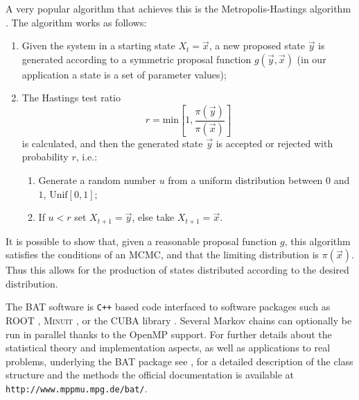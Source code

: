 A very popular algorithm that achieves this is the Metropolis-Hastings algorithm \cite{Metropolis,Hastings}. The algorithm works as follows:
\begin{enumerate}
	\item Given the system in a starting state $X_t=\vec{x}$, a new proposed state $\vec{y}$ is generated according to a symmetric proposal function $g(\vec{y},\vec{x})$ (in our application a state is a set of parameter values);
	\item The Hastings test ratio
		\[r=\text{min}\left[1,\frac{\pi(\vec{y})}{\pi(\vec{x})}\right]\]
		is calculated, and then the generated state $\vec{y}$ is accepted or rejected with probability $r$, i.e.:
		\begin{enumerate}
			\item Generate a random number $u$ from a uniform distribution between $0$ and $1$, $\text{Unif}[0,1]$;
			\item If $u<r$ set $X_{t+1}=\vec{y}$, else take $X_{t+1}=\vec{x}$.
		\end{enumerate}
\end{enumerate}
It is possible to show that, given a reasonable proposal function $g$, this algorithm satisfies the conditions of an MCMC, and that the limiting distribution is $\pi(\vec{x})$. Thus this allows for the production of states distributed according to the desired distribution.

 The BAT software is \texttt{C++} based code interfaced to software packages such as ROOT \cite{ROOT}, \textsc{Minuit} \cite{MINUIT}, or the CUBA library \cite{CUBA}. Several Markov chains can optionally be run in parallel thanks to the OpenMP \cite{openmp} support. For further details about the statistical theory and implementation aspects, as well as applications to real problems, underlying the BAT package see \cite{BAT}, for a detailed description of the class structure and the methods the official documentation is available at \texttt{http://www.mppmu.mpg.de/bat/}.

